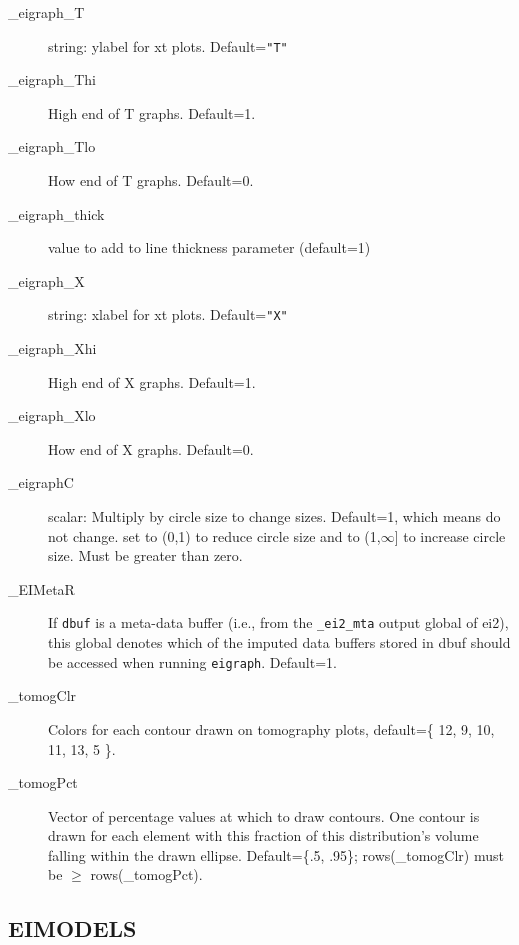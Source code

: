 \documentclass[11pt,titlepage]{article}
\begin{document}
\begin{description}
\item[\_eigraph\_T] string: ylabel for xt plots. Default=\texttt{"T"}

\item[\_eigraph\_Thi] High end of T graphs. Default=1.

\item[\_eigraph\_Tlo] How end of T graphs. Default=0.

\item[\_eigraph\_thick] value to add to line thickness parameter
  (default=1)

\item[\_eigraph\_X] string: xlabel for xt plots. Default=\texttt{"X"}


\item[\_eigraph\_Xhi] High end of X graphs. Default=1.

\item[\_eigraph\_Xlo] How end of X graphs. Default=0.

\item[\_eigraphC] scalar: Multiply by circle size to change sizes.
  Default=1, which means do not change.  set to (0,1) to reduce circle
  size and to (1,$\infty$] to increase circle size.  Must be greater
  than zero.

\item[\_EIMetaR] If \texttt{dbuf} is a meta-data buffer (i.e., from the
  \texttt{\_ei2\_mta} output global of ei2), this global denotes which
  of the imputed data buffers stored in dbuf should be accessed when
  running \texttt{eigraph}.  Default=1.

\item[\_tomogClr] Colors for each contour drawn on tomography plots,
  default=\{ 12, 9, 10, 11, 13, 5 \}.

\item[\_tomogPct] Vector of percentage values at which to draw
  contours.  One contour is drawn for each element with this fraction
  of this distribution's volume falling within the drawn ellipse.
  Default=\{.5, .95\}; rows(\_tomogClr) must be $\geq$
  rows(\_tomogPct).
\end{description}


\subsection{EIMODELS} \label{eimodels}
\end{document}

